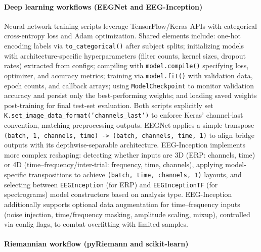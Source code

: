 \documentclass[12pt]{report}
\begin{document}
\paragraph{Deep learning workflows (EEGNet and EEG-Inception)}\mbox{}

Neural network training scripts leverage TensorFlow/Keras APIs with categorical cross-entropy loss and Adam optimization. Shared elements include: one-hot encoding labels via \texttt{to\_categorical()} after subject splits; initializing models with architecture-specific hyperparameters (filter counts, kernel sizes, dropout rates) extracted from configs; compiling with \texttt{model.compile()} specifying loss, optimizer, and accuracy metrics; training via \texttt{model.fit()} with validation data, epoch counts, and callback arrays; using \texttt{ModelCheckpoint} to monitor validation accuracy and persist only the best-performing weights; and loading saved weights post-training for final test-set evaluation. Both scripts explicitly set \texttt{K.set\_image\_data\_format('channels\_last')} to enforce Keras' channel-last convention, matching preprocessing outputs. EEGNet applies a simple transpose \texttt{(batch, 1, channels, time) -> (batch, channels, time, 1)} to align bridge outputs with its depthwise-separable architecture. EEG-Inception implements more complex reshaping: detecting whether inputs are 3D (ERP: channels, time) or 4D (time--frequency/inter-trial: frequency, time, channels), applying model-specific transpositions to achieve \texttt{(batch, time, channels, 1)} layouts, and selecting between \texttt{EEGInception} (for ERP) and \texttt{EEGInceptionTF} (for spectrograms) model constructors based on analysis type. EEG-Inception additionally supports optional data augmentation for time--frequency inputs (noise injection, time/frequency masking, amplitude scaling, mixup), controlled via config flags, to combat overfitting with limited samples.

\paragraph{Riemannian workflow (pyRiemann and scikit-learn)}\mbox{}
\end{document}
